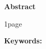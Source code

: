 \thispagestyle{empty}

\begin{center}
	\Large
	\textbf{Abstract}
\end{center}
\vspace{5pt}

	
  1page

\textbf{Keywords: } \textit{}
	
\newpage